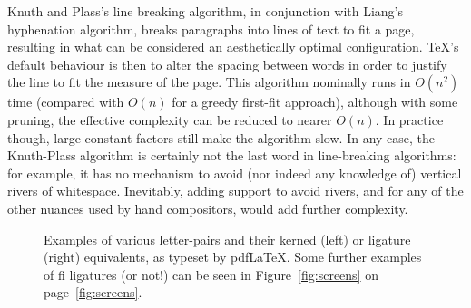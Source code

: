 Knuth and Plass's line breaking algorithm, in conjunction with Liang's hyphenation algorithm, breaks paragraphs into lines of text to fit a page, resulting in what can be considered an aesthetically optimal configuration. \TeX 's default behaviour is then to alter the spacing between words in order to justify the line to fit the measure of the page. This algorithm nominally runs in $O(n^2)$ time (compared with $O(n)$ for a greedy first-fit approach), although with some pruning, the effective complexity can be reduced to nearer $O(n)$.\hspace{0pt}\cite{Hirschberg1987,Eppstein1992,Hurst2009} In practice though, large constant factors still make the algorithm slow. In any case, the Knuth-Plass algorithm is certainly not the last word in line-breaking algorithms: for example, it has no mechanism to avoid (nor indeed any knowledge of) vertical rivers of whitespace.\hspace{0pt}\cite{Mittelbach1992} Inevitably, adding support to avoid rivers, and for any of the other nuances used by hand compositors, would add further complexity.



\begin{figure}
 \caption[Examples of microtypographical techniques]{Examples of various letter-pairs and their kerned (left) or ligature (right) equivalents, as typeset by pdf\LaTeX{}. Some further examples of fi ligatures (or not!) can be seen in Figure~\ref{fig:screens} on page~\ref{fig:screens}.}
 \label{fig:kern-lig}
\end{figure}


